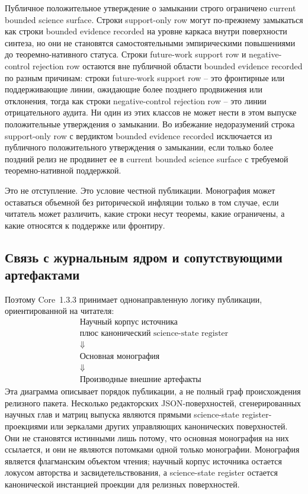 Публичное положительное утверждение о замыкании строго ограничено
current bounded science surface. Строки support-only row могут по-прежнему
замыкаться как строки bounded evidence recorded на уровне каркаса внутри поверхности синтеза, но
они не становятся самостоятельными эмпирическими повышениями до
теоремно-нативного статуса. Строки future-work support row и negative-control rejection row
остаются вне публичной области bounded evidence recorded по разным причинам: строки
future-work support row -- это фронтирные или поддерживающие линии, ожидающие
более позднего продвижения или отклонения, тогда как строки negative-control rejection row
-- это линии отрицательного аудита. Ни один из этих классов не может нести в
этом выпуске положительные утверждения о замыкании.
Во избежание недоразумений строка support-only row с вердиктом
bounded evidence recorded исключается из публичного положительного утверждения о
замыкании, если только более поздний релиз не продвинет ее в
current bounded science surface с требуемой теоремно-нативной поддержкой.

Это не отступление. Это условие честной публикации. Монография может оставаться
объемной без риторической инфляции только в том случае, если читатель может
различить, какие строки несут теоремы, какие ограничены, а какие относятся к
поддержке или фронтиру.

\subsection{Связь с журнальным ядром и сопутствующими артефактами}

Поэтому Core~1.3.3 принимает однонаправленную логику публикации, ориентированной
на читателя:
\[
\begin{gathered}
\text{Научный корпус источника}\\
\text{плюс канонический science-state register}\\
\Downarrow\\
\text{Основная монография}\\
\Downarrow\\
\text{Производные внешние артефакты}
\end{gathered}
\]
Эта диаграмма описывает порядок публикации, а не полный граф происхождения
релизного пакета. Несколько редакторских JSON-поверхностей, сгенерированных
научных глав и матриц выпуска являются прямыми science-state register-проекциями или зеркалами
других управляющих канонических поверхностей. Они не становятся истинными лишь
потому, что основная монография на них ссылается, и они не являются потомками
одной только монографии. Монография является флагманским объектом чтения;
научный корпус источника остается локусом авторства и засвидетельствования, а
science-state register остается канонической инстанцией проекции для релизных поверхностей.

